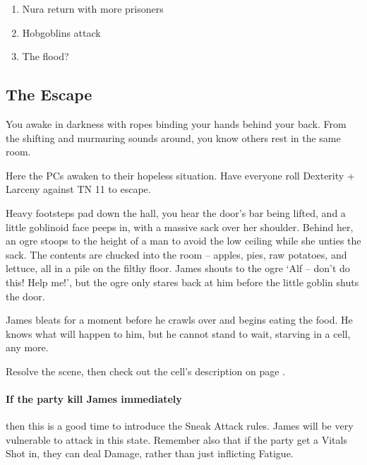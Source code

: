 \begin{multicols}{2}

\begin{enumerate}

	\item{Nura return with more prisoners}
	\item{Hobgoblins attack}
	\item{The flood?}

\end{enumerate}

\subsection{The Escape}
\label{escape}

\begin{boxtext}

	You awake in darkness with ropes binding your hands behind your back.
	From the shifting and murmuring sounds around, you know others rest in the same room.

\end{boxtext}

Here the PCs awaken to their hopeless situation.
Have everyone roll Dexterity + Larceny against TN 11 to escape.

\begin{boxtext}

	Heavy footsteps pad down the hall, you hear the door's bar being lifted, and a little goblinoid face peeps in, with a massive sack over her shoulder.
	Behind her, an ogre stoops to the height of a man to avoid the low ceiling while she unties the sack.
	The contents are chucked into the room -- apples, pies, raw potatoes, and lettuce, all in a pile on the filthy floor.
	James shouts to the ogre `Alf -- don't do this! Help me!', but the ogre only stares back at him before the little goblin shuts the door.

\end{boxtext}

James bleats for a moment before he crawls over and begins eating the food.
He knows what will happen to him, but he cannot stand to wait, starving in a cell, any more.

Resolve the scene, then check out the cell's description on page \pageref{entrycell}.

\paragraph{If the party kill James immediately}
then this is a good time to introduce the Sneak Attack rules.
James will be very vulnerable to attack in this state.
Remember also that if the party get a Vitals Shot in, they can deal Damage, rather than just inflicting Fatigue.



\end{multicols}
